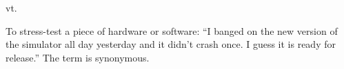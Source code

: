  vt.

To stress-test a piece of hardware or software: ``I banged on the new version of
the simulator all day yesterday and it didn't crash once. I guess it is ready
for release.'' The term  is synonymous.


